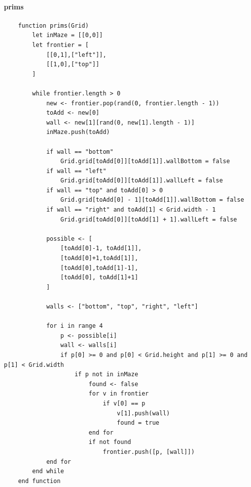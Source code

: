 \documentclass{article}
\begin{document}
\paragraph{prims}
\begin{verbatim}
    function prims(Grid)
        let inMaze = [[0,0]]
        let frontier = [
            [[0,1],["left"]],
            [[1,0],["top"]]
        ]
        
        while frontier.length > 0
            new <- frontier.pop(rand(0, frontier.length - 1))
            toAdd <- new[0]
            wall <- new[1][rand(0, new[1].length - 1)]
            inMaze.push(toAdd)

            if wall == "bottom"
                Grid.grid[toAdd[0]][toAdd[1]].wallBottom = false
            if wall == "left"
                Grid.grid[toAdd[0]][toAdd[1]].wallLeft = false
            if wall == "top" and toAdd[0] > 0
                Grid.grid[toAdd[0] - 1][toAdd[1]].wallBottom = false
            if wall == "right" and toAdd[1] < Grid.width - 1
                Grid.grid[toAdd[0]][toAdd[1] + 1].wallLeft = false
            
            possible <- [
                [toAdd[0]-1, toAdd[1]],
                [toAdd[0]+1,toAdd[1]],
                [toAdd[0],toAdd[1]-1],
                [toAdd[0], toAdd[1]+1]
            ]

            walls <- ["bottom", "top", "right", "left"]

            for i in range 4
                p <- possible[i]
                wall <- walls[i]
                if p[0] >= 0 and p[0] < Grid.height and p[1] >= 0 and p[1] < Grid.width
                    if p not in inMaze
                        found <- false
                        for v in frontier
                            if v[0] == p
                                v[1].push(wall)
                                found = true
                        end for
                        if not found
                            frontier.push([p, [wall]])
            end for
        end while
    end function
\end{verbatim}
\end{document}
